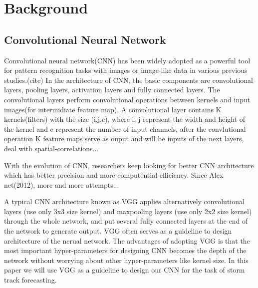 \chapter{Background}

\section{Convolutional Neural Network}
Convolutional neural network(CNN) has been widely adopted as a powerful tool for pattern recognition tasks with images or image-like data in various previous studies.(cite) 
In the architecture of CNN, the basic components are convolutional layers, pooling layers, activation layers and fully connected layers. The convolutional layers perform convolutional operations between kernels and input images(for intermidiate feature map). A convolutional layer contains K kernels(filters) with the size (i,j,c), where i, j represent the width and height of the kernel and c represent the number of input channels, after the convlutional operation K feature maps serve as ouput and will be inputs of the next layers, deal with spatial-correlations...

With the evolution of CNN, researchers keep looking for better CNN architecture which has better precision and more computential efficiency. Since Alex net(2012), more and more attempts... 

A typical CNN architecture known as VGG applies alternatively convolutional layers (use only 3x3 size kernel) and maxpooling layers (use only 2x2 size kernel) through the whole network, and put several fully connected layers at the end of the network to generate output. VGG often serves as a guideline to design architecture of the nerual network. The advantages of adopting VGG is that the most important hyper-parameters for designing CNN becomes the depth of the network without worrying about other hyper-parameters like kernel size. In this paper we will use VGG as a guideline to design our CNN for the task of storm track forecasting.

